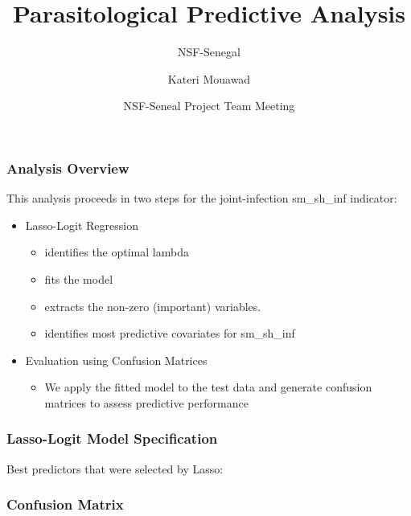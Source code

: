 \documentclass{beamer}
\title[Predictive Analysis] %
{Parasitological Predictive Analysis}
\subtitle{NSF-Senegal}
\author{Kateri Mouawad} %
\date[June 2025] %
{NSF-Seneal Project Team Meeting}
\begin{document}
\frame{\titlepage}

\begin{frame}
\frametitle{Analysis Overview}
This analysis proceeds in two steps for the joint-infection sm\_sh\_inf indicator:

\begin{itemize}
    \item<1-> Lasso-Logit Regression
       \begin{itemize}
             \item<2-> identifies the optimal lambda
             \item<3-> fits the model
             \item<4-> extracts the non-zero (important) variables.
             \item<5-> identifies most predictive covariates for sm\_sh\_inf
        \end{itemize}
    \item<3-> Evaluation using Confusion Matrices
         \begin{itemize}
                 \item<4-> We apply the fitted model to the test data and generate confusion matrices to assess predictive performance
         \end{itemize}
\end{itemize}

\end{frame}


\begin{frame}
\frametitle{Lasso-Logit Model Specification}

Best predictors that were selected by Lasso:


\end{frame}

\begin{frame}
\frametitle{Confusion Matrix}





\end{frame}
\end{document}
